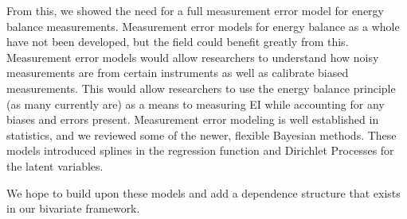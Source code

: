 \documentclass[11pt]{article}\usepackage[]{graphicx}\usepackage[]{color}
\begin{document}
From this, we showed the need for a full measurement error model for energy balance measurements. Measurement error models for energy balance as a whole have not been developed, but the field could benefit greatly from this. Measurement error models would allow researchers to understand how noisy measurements are from certain instruments as well as calibrate biased measurements. This would allow researchers to use the energy balance principle (as many currently are) as a means to measuring EI while accounting for any biases and errors present. Measurement error modeling is well established in statistics, and we reviewed some of the newer, flexible Bayesian methods. These models introduced splines in the regression function and Dirichlet Processes for the latent variables. 

We hope to build upon these models and add a dependence structure that exists in our bivariate framework. 




\end{document}
